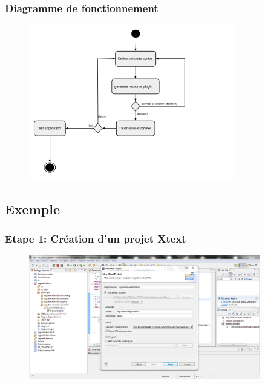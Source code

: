 \documentclass{beamer}
\begin{document}
	\begin{frame}
	\frametitle{Diagramme de fonctionnement}
	\begin{figure}[h]
	\centering
		\includegraphics[width=0.80\textwidth]{DiagrammeXtext.png}
	\label{fig:DiagrammeFluxXtext}
\end{figure}

\end{frame} 

\subsection{Exemple}

	\begin{frame}
	\frametitle{Etape 1: Création d'un projet Xtext}
	\begin{figure}[h]
	\centering
			\includegraphics[width=0.90\textwidth]{1.PNG}
	\label{fig:1}
\end{figure}

\end{frame} 
\end{document}
